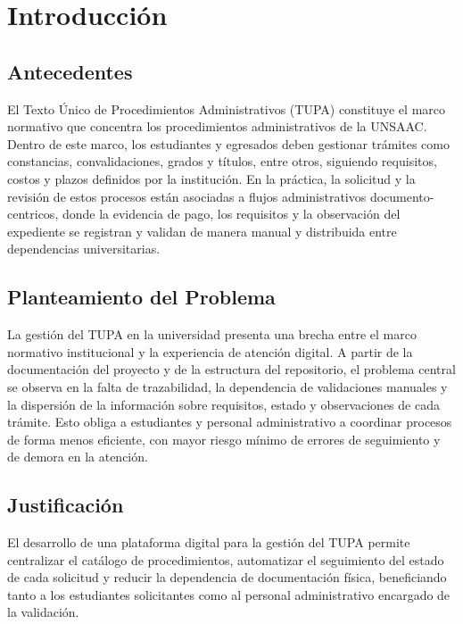 \section{Introducción}

\subsection{Antecedentes}
El Texto Único de Procedimientos Administrativos (TUPA) constituye el marco
normativo que concentra los procedimientos administrativos de la UNSAAC.
Dentro de este marco, los estudiantes y egresados deben gestionar trámites
como constancias, convalidaciones, grados y títulos, entre otros, siguiendo
requisitos, costos y plazos definidos por la institución. En la práctica, la
solicitud y la revisión de estos procesos están asociadas a flujos
administrativos documento-centricos, donde la evidencia de pago, los requisitos
y la observación del expediente se registran y validan de manera manual y
distribuida entre dependencias universitarias.

\subsection{Planteamiento del Problema}
La gestión del TUPA en la universidad presenta una brecha entre el marco
normativo institucional y la experiencia de atención digital. A partir de la
documentación del proyecto y de la estructura del repositorio, el problema
central se observa en la falta de trazabilidad, la dependencia de validaciones
manuales y la dispersión de la información sobre requisitos, estado y
observaciones de cada trámite. Esto obliga a estudiantes y personal
administrativo a coordinar procesos de forma menos eficiente, con mayor riesgo
mínimo de errores de seguimiento y de demora en la atención.

\subsection{Justificación}
El desarrollo de una plataforma digital para la gestión del TUPA permite
centralizar el catálogo de procedimientos, automatizar el seguimiento del
estado de cada solicitud y reducir la dependencia de documentación física,
beneficiando tanto a los estudiantes solicitantes como al personal
administrativo encargado de la validación.

